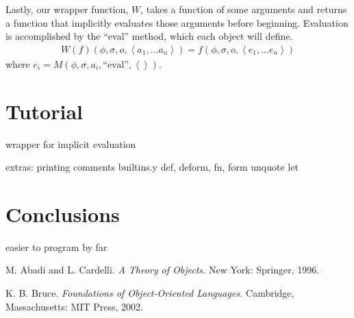 \documentclass[twocolumn]{article}
\begin{document}
Lastly, our wrapper function, $W$, takes a function of some arguments
and returns a function that implicitly evaluates those arguments
before beginning. Evaluation is accomplished by the ``eval'' method,
which each object will define.
\begin{multline*}
W(f)(\phi,\sigma,o,\left<a_1,\ldots a_n\right>) =
f(\phi,\sigma,o,\left<e_1,\ldots e_n\right>)
\end{multline*}
where $e_i = M(\phi,\sigma,a_i,\text{``eval''},\left<\right>)$.

\section*{Tutorial}

wrapper for implicit evaluation

extras:
printing
comments
builtins.y
def, deform, fn, form
unquote
let

\section*{Conclusions}
easier to program by far


\begin{thebibliography}{9}
 M. Abadi and L. Cardelli. \textit{A Theory of Objects.} New
  York: Springer, 1996.

 K. B. Bruce. \textit{Foundations of Object-Oriented
    Languages.} Cambridge, Massachusetts: MIT Press, 2002.
\end{thebibliography}
\end{document}
